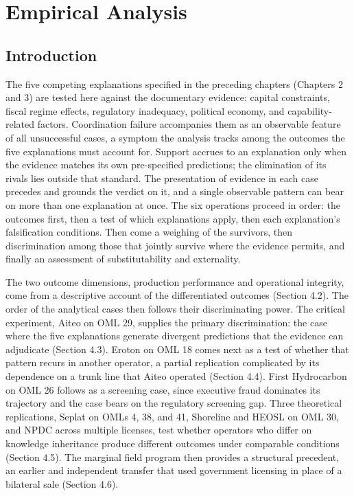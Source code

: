 \hypertarget{empirical-analysis}{%
\chapter{Empirical Analysis}\label{empirical-analysis}}

\hypertarget{introduction}{%
\section{Introduction}\label{introduction}}

The five competing explanations specified in the preceding chapters
(Chapters 2 and 3) are tested here against the documentary evidence:
capital constraints, fiscal regime effects, regulatory inadequacy,
political economy, and capability-related factors. Coordination failure
accompanies them as an observable feature of all unsuccessful cases, a
symptom the analysis tracks among the outcomes the five explanations
must account for. Support accrues to an explanation only when the
evidence matches its own pre-specified predictions; the elimination of
its rivals lies outside that standard. The presentation of evidence in
each case precedes and grounds the verdict on it, and a single
observable pattern can bear on more than one explanation at once. The
six operations proceed in order: the outcomes first, then a test of
which explanations apply, then each explanation's falsification
conditions. Then come a weighing of the survivors, then discrimination
among those that jointly survive where the evidence permits, and finally
an assessment of substitutability and externality.

The two outcome dimensions, production performance and operational
integrity, come from a descriptive account of the differentiated
outcomes (Section 4.2). The order of the analytical cases then follows
their discriminating power. The critical experiment, Aiteo on OML 29,
supplies the primary discrimination: the case where the five
explanations generate divergent predictions that the evidence can
adjudicate (Section 4.3). Eroton on OML 18 comes next as a test of
whether that pattern recurs in another operator, a partial replication
complicated by its dependence on a trunk line that Aiteo operated
(Section 4.4). First Hydrocarbon on OML 26 follows as a screening case,
since executive fraud dominates its trajectory and the case bears on the
regulatory screening gap. Three theoretical replications, Seplat on OMLs
4, 38, and 41, Shoreline and HEOSL on OML 30, and NPDC across multiple
licenses, test whether operators who differ on knowledge inheritance
produce different outcomes under comparable conditions (Section 4.5).
The marginal field program then provides a structural precedent, an
earlier and independent transfer that used government licensing in place
of a bilateral sale (Section 4.6).

